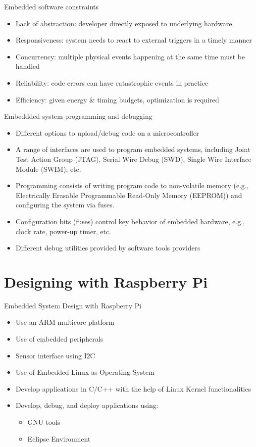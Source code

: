 \begin{frame}{Embedded software constraints}
\begin{itemize}
    \item Lack of abstraction: developer directly exposed to underlying hardware
    \item Responsiveness: system needs to react to external triggers in a timely manner
    \item Concurrency: multiple physical events happening at the same time must be handled
    \item Reliability: code errors can have catastrophic events in practice
    \item Efficiency: given energy \& timing budgets, optimization is required
\end{itemize}
\end{frame}

\begin{frame}{Embeddded system programming and debugging}
\begin{itemize}
    \item Different options to upload/debug code on a microcontroller
    \item A range of interfaces are used to program embedded systems, including Joint Test Action Group (JTAG), Serial Wire Debug (SWD), Single Wire Interface Module (SWIM), etc.
    \item Programming consists of writing program code to non-volatile memory (e.g., Electrically Erasable Programmable Read-Only Memory (EEPROM)) and configuring the system via fuses.
    \item Configuration bits (fuses) control key behavior of embedded hardware, e.g., clock rate, power-up timer, etc.
    \item Different debug utilities provided by software tools providers
\end{itemize}
\end{frame}

\section{Designing with Raspberry Pi}
\begin{frame}{Embedded System Design with Raspberry Pi}
  \begin{itemize}
    \item Use an ARM multicore platform
    \item Use of embedded peripherals
    \item Sensor interface using I2C
    \item Use of Embedded Linux as Operating System
    \item Develop applications in C/C++ with the help of Linux Kernel functionalities
    \item Develop, debug, and deploy applications using:
    \begin{itemize}
        \item GNU tools
        \item Eclipse Environment
    \end{itemize}
\end{itemize}
\end{frame}

